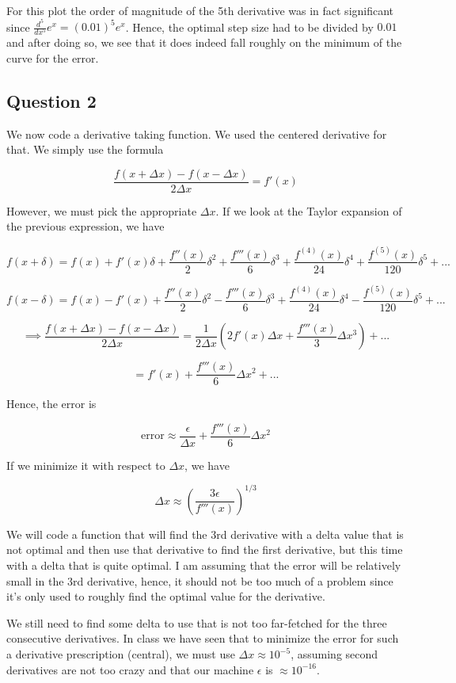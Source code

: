 \documentclass[
]{article}
\begin{document}
For this plot the order of magnitude of the 5th derivative was in fact
significant since \(\frac{d^5}{dx^5} e^x = (0.01)^5e^x\). Hence, the
optimal step size had to be divided by \(0.01\) and after doing so, we
see that it does indeed fall roughly on the minimum of the curve for the
error.

\hypertarget{question-2}{%
\subsection{Question 2}\label{question-2}}

We now code a derivative taking function. We used the centered
derivative for that. We simply use the formula

\[\frac{f(x+\Delta x)-f(x - \Delta x)}{2 \Delta x} = f'(x)\]

However, we must pick the appropriate \(\Delta x\). If we look at the
Taylor expansion of the previous expression, we have

\[f(x + \delta) = f(x) + f'(x) \delta + \frac{f''(x)}{2}\delta^2 + \frac{f'''(x)}{6}\delta^3 + \frac{f^{(4)}(x)}{24}\delta^4 + \frac{f^{(5)}(x)}{120}\delta^5 + ...  \]

\[f(x - \delta) = f(x) - f'(x) + \frac{f''(x)}{2}\delta^2 - \frac{f'''(x)}{6}\delta^3 + \frac{f^{(4)}(x)}{24}\delta^4 - \frac{f^{(5)}(x)}{120}\delta^5 + ...  \]

\[\implies \frac{f(x+\Delta x)-f(x - \Delta x)}{2 \Delta x} = \frac{1}{2 \Delta x}\left( 2 f'(x) \Delta x + \frac{f'''(x)}{3}\Delta x^3\right) + ...\]

\[ =  f'(x)  + \frac{f'''(x)}{6}\Delta x^2 + ...\]

Hence, the error is

\[\text{error} \approx \frac{\epsilon}{\Delta x}  + \frac{f'''(x)}{6}\Delta x^2\]

If we minimize it with respect to \(\Delta x\), we have

\[\Delta x \approx \left(\frac{3 \epsilon}{f'''(x)} \right)^{1/3}\]

We will code a function that will find the 3rd derivative with a delta
value that is not optimal and then use that derivative to find the first
derivative, but this time with a delta that is quite optimal. I am
assuming that the error will be relatively small in the 3rd derivative,
hence, it should not be too much of a problem since it's only used to
roughly find the optimal value for the derivative.

We still need to find some delta to use that is not too far-fetched for
the three consecutive derivatives. In class we have seen that to
minimize the error for such a derivative prescription (central), we must
use \(\Delta x \approx 10^{-5}\), assuming second derivatives are not
too crazy and that our machine \(\epsilon\) is \(\approx 10^{-16}\).
\end{document}
